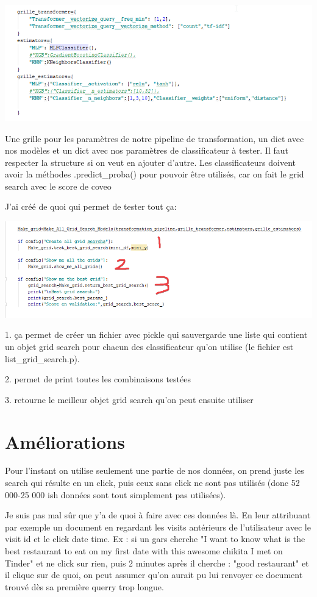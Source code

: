 \documentclass[12pt,french]{article}
\begin{document}
\includegraphics[width=\linewidth]{grid}

Une grille pour les paramètres de notre pipeline de transformation, un dict avec nos modèles et un dict avec nos paramètres de classificateur à tester. Il faut respecter la structure si on veut en ajouter d'autre. Les classificateurs doivent avoir la méthodes .predict\_proba() pour pouvoir être utilisés, car on fait le grid search avec le score de coveo

J'ai créé de quoi qui permet de tester tout ça:

\includegraphics[width=\linewidth]{etapes_grid}

1. ça permet de créer un fichier avec pickle qui sauvergarde une liste qui contient un objet grid search pour chacun des classificateur qu'on utilise (le fichier est list\_grid\_search.p).

2. permet de print toutes les combinaisons testées 

3. retourne le meilleur objet grid search qu'on peut ensuite utiliser

\section*{Améliorations}
Pour l'instant on utilise seulement une partie de nos données, on prend juste les search qui résulte en un click, puis ceux sans click ne sont pas utilisés (donc 52 000-25 000 ish données sont tout simplement pas utilisées).

Je suis pas mal sûr que y'a de quoi à faire avec ces données là. En leur attribuant par exemple un document en regardant les visits antérieurs de l'utilisateur avec le visit id et le click date time.  Ex : si un gars cherche "I want to know what is the best restaurant to eat on my first date with this awesome chikita I met on Tinder" et ne click sur rien, puis 2 minutes après il cherche : "good restaurant" et il clique sur de quoi, on peut assumer qu'on aurait pu lui renvoyer ce document trouvé dès sa première querry trop longue.
\end{document}
